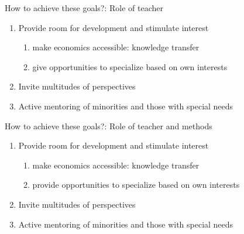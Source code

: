 \begin{frame}{How to achieve these goals?: \alert{Role of teacher}}
	
	\begin{enumerate}
		\item<+-> Provide room for development and stimulate interest
		\begin{enumerate}
	\item<+-> {make economics accessible: knowledge transfer} %
	\item<+-> {give opportunities to specialize based on own interests}
\end{enumerate}
		\item<+-> Invite multitudes of perspectives
		\item<+-> Active mentoring of minorities and those with special needs
	\end{enumerate}
\end{frame}


\begin{frame}{How to achieve these goals?: {Role of teacher} and \alert{methods}}
	
	\begin{enumerate}
		\item Provide room for development and  stimulate interest
				\begin{enumerate}
					\item {make economics accessible: knowledge transfer} %
						\item {provide opportunities to specialize based on own interests}
					\end{enumerate}
		\item Invite multitudes of perspectives
		\item Active mentoring of minorities and those with special needs
	\end{enumerate}
\end{frame}


